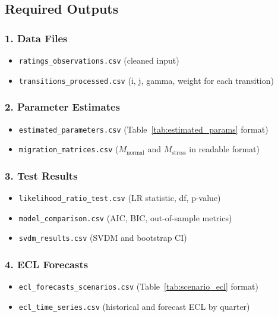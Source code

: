 \documentclass[12pt,a4paper]{article}
\newcommand{\Mnormal}{M_{\text{normal}}}
\newcommand{\Mstress}{M_{\text{stress}}}
\begin{document}
\subsection{Required Outputs}

\subsubsection*{1. Data Files}
\begin{itemize}[noitemsep]
    \item \texttt{ratings\_observations.csv} (cleaned input)
    \item \texttt{transitions\_processed.csv} (i, j, gamma, weight for each transition)
\end{itemize}

\subsubsection*{2. Parameter Estimates}
\begin{itemize}[noitemsep]
    \item \texttt{estimated\_parameters.csv} (Table~\ref{tab:estimated_params} format)
    \item \texttt{migration\_matrices.csv} ($\Mnormal$ and $\Mstress$ in readable format)
\end{itemize}

\subsubsection*{3. Test Results}
\begin{itemize}[noitemsep]
    \item \texttt{likelihood\_ratio\_test.csv} (LR statistic, df, p-value)
    \item \texttt{model\_comparison.csv} (AIC, BIC, out-of-sample metrics)
    \item \texttt{svdm\_results.csv} (SVDM and bootstrap CI)
\end{itemize}

\subsubsection*{4. ECL Forecasts}
\begin{itemize}[noitemsep]
    \item \texttt{ecl\_forecasts\_scenarios.csv} (Table~\ref{tab:scenario_ecl} format)
    \item \texttt{ecl\_time\_series.csv} (historical and forecast ECL by quarter)
\end{itemize}
\end{document}
